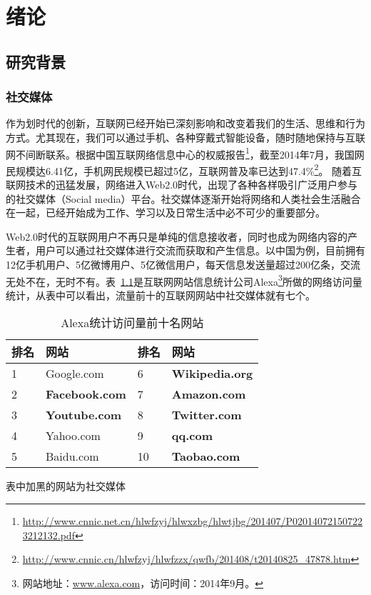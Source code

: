 \chapter{绪论}
\label{Intro}

\section{研究背景}

\subsection{社交媒体}
\label{ch1_social}
作为划时代的创新，互联网已经开始已深刻影响和改变着我们的生活、思维和行为方式。尤其现在，我们可以通过手机、各种穿戴式智能设备，随时随地保持与互联网不间断联系。根据中国互联网络信息中心的权威报告\footnote{\url{http://www.cnnic.net.cn/hlwfzyj/hlwxzbg/hlwtjbg/201407/P020140721507223212132.pdf}}，截至2014年7月，我国网民规模达6.41亿，手机网民规模已超过5亿，互联网普及率已达到47.4\%\footnote{\url{http://www.cnnic.cn/hlwfzyj/hlwfzzx/qwfb/201408/t20140825\_47878.htm}}。
随着互联网技术的迅猛发展，网络进入Web2.0时代，出现了各种各样吸引广泛用户参与的社交媒体（Social media）平台。社交媒体逐渐开始将网络和人类社会生活融合在一起，已经开始成为工作、学习以及日常生活中必不可少的重要部分。


Web2.0时代的互联网用户不再只是单纯的信息接收者，同时也成为网络内容的产生者，用户可以通过社交媒体进行交流而获取和产生信息。以中国为例，目前拥有12亿手机用户、5亿微博用户、5亿微信用户，每天信息发送量超过200亿条，交流无处不在，无时不有。表~\ref{tab1-1}是互联网网站信息统计公司Alexa\footnote{网站地址：\url{www.alexa.com}，访问时间：2014年9月。}所做的网络访问量统计，从表中可以看出，流量前十的互联网网站中社交媒体就有七个。

\begin{table}[htp]
\centering
\caption{Alexa统计访问量前十名网站}
\label{tab1-1}
\begin{threeparttable}
 \begin{tabular}{|l|l|l|l|}
 \hline
 排名&网站&排名&网站\\
 \hline
 1& Google.com& 6&\textbf{ Wikipedia.org\tnote{1}}\\
 \hline
 2& \textbf{Facebook.com}& 7& \textbf{Amazon.com}\\
 \hline
 3& \textbf{Youtube.com}& 8& \textbf{Twitter.com}\\
 \hline
 4& Yahoo.com& 9& \textbf{qq.com}\\
 \hline
 5& Baidu.com& 10& \textbf{Taobao.com}\\
 \hline
\end{tabular}
\begin{tablenotes}
  \centering
  \footnotesize
\item[1]表中加黑的网站为社交媒体
\end{tablenotes}
\end{threeparttable}
\end{table}

